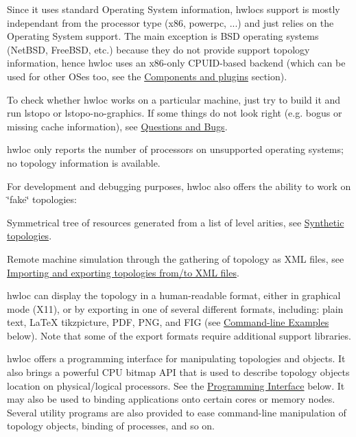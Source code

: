 Since it uses standard Operating System information, hwloc\textquotesingle{}s support is mostly independant from the processor type (x86, powerpc, ...) and just relies on the Operating System support. The main exception is B\+SD operating systems (Net\+B\+SD, Free\+B\+SD, etc.) because they do not provide support topology information, hence hwloc uses an x86-\/only C\+P\+U\+I\+D-\/based backend (which can be used for other O\+Ses too, see the \hyperlink{a00392}{Components and plugins} section).

To check whether hwloc works on a particular machine, just try to build it and run {\ttfamily lstopo} or {\ttfamily lstopo-\/no-\/graphics}. If some things do not look right (e.\+g. bogus or missing cache information), see \hyperlink{index_bugs}{Questions and Bugs}.

hwloc only reports the number of processors on unsupported operating systems; no topology information is available.

For development and debugging purposes, hwloc also offers the ability to work on \char`\"{}fake\char`\"{} topologies\+:


\begin{DoxyItemize}
\item Symmetrical tree of resources generated from a list of level arities, see \hyperlink{a00389}{Synthetic topologies}. 
\item Remote machine simulation through the gathering of topology as X\+ML files, see \hyperlink{a00388}{Importing and exporting topologies from/to X\+ML files}. 
\end{DoxyItemize}

hwloc can display the topology in a human-\/readable format, either in graphical mode (X11), or by exporting in one of several different formats, including\+: plain text, La\+TeX tikzpicture, P\+DF, P\+NG, and F\+IG (see \hyperlink{a00379_cli_examples}{Command-\/line Examples} below). Note that some of the export formats require additional support libraries.

hwloc offers a programming interface for manipulating topologies and objects. It also brings a powerful C\+PU bitmap A\+PI that is used to describe topology objects location on physical/logical processors. See the \hyperlink{a00379_interface}{Programming Interface} below. It may also be used to binding applications onto certain cores or memory nodes. Several utility programs are also provided to ease command-\/line manipulation of topology objects, binding of processes, and so on.

